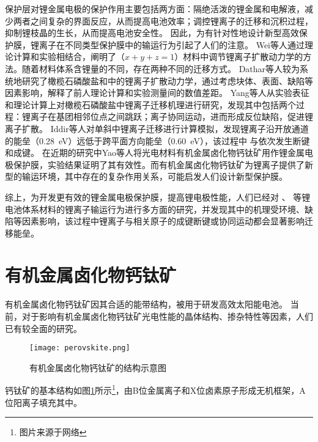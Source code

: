 保护层对锂金属电极的保护作用主要包括两方面：隔绝活泼的锂金属和电解液，减少两者之间复杂的界面反应，从而提高电池效率；调控锂离子的迁移和沉积过程，抑制锂枝晶的生长，从而提高电池安全性。
因此，为有针对性地设计新型高效保护膜，锂离子在不同类型保护膜中的输运行为引起了人们的注意。
Wei等人通过理论计算和实验相结合，阐明了（$x+y+z=1$）材料中调节锂离子扩散动力学的方法。随着材料体系含锂量的不同，存在两种不同的迁移方式。
Dathar等人较为系统地研究了橄榄石磷酸盐和中的锂离子扩散动力学，通过考虑块体、表面、缺陷等因素影响，解释了前人理论计算和实验测量间的数值差距。
Yang等人从实验表征和理论计算上对橄榄石磷酸盐中锂离子迁移机理进行研究，发现其中包括两个过程：锂离子在基团相邻位点之间跳跃；离子协同运动，进而形成反位缺陷，促进锂离子扩散。
Iddir等人对单斜中锂离子迁移进行计算模拟，发现锂离子沿开放通道的能垒（\SI{0.28} {eV}）远低于跨平面方向能垒（\SI{0.60}{eV}），该过程中  与依次发生断键和成键。
在近期的研究中Yao等人将光电材料有机金属卤化物钙钛矿用作锂金属电极保护膜，实验结果证明了其有效性。而有机金属卤化物钙钛矿为锂离子提供了新型的输运环境，其中存在的复杂作用关系，可能启发人们设计新型保护膜。

综上，为开发更有效的锂金属电极保护膜，提高锂电极性能，人们已经对  、 等锂电池体系材料的锂离子输运行为进行多方面的研究，并发现其中的机理受环境、缺陷等因素影响，该过程中锂离子与相关原子的成键断键或协同运动都会显著影响迁移能垒。

\section{有机金属卤化物钙钛矿}

有机金属卤化物钙钛矿因其合适的能带结构，被用于研发高效太阳能电池。
当前，对于影响有机金属卤化物钙钛矿光电性能的晶体结构、掺杂特性等因素，人们已有较全面的研究。

\begin{figure}[htbp]
    \centering
    \texttt{[image: perovskite.png]}
    \caption{有机金属卤化物钙钛矿的结构示意图}
    \label{fig:perovskite}
\end{figure}

钙钛矿的基本结构如图\ref{fig:perovskite}所示\footnote{图片来源于网络}，由B位金属离子和X位卤素原子形成无机框架，A位阳离子填充其中。

